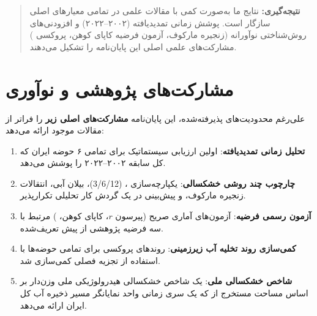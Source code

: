 \documentclass[12pt, a4paper]{article}
\begin{document}
\begin{quote}
  \textbf{نتیجه‌گیری:} نتایج ما به‌صورت کمی با مقالات علمی در تمامی معیارهای اصلی
  سازگار است. پوشش زمانی تمدیدیافته (۲۰۰۲–۲۰۲۲) و افزودنی‌های روش‌شناختی نوآورانه
  (زنجیره مارکوف، آزمون فرضیه کاپای کوهن، پروکسی ) مشارکت‌های علمی اصلی این
  پایان‌نامه را تشکیل می‌دهند.
\end{quote}

\section{مشارکت‌های پژوهشی و نوآوری}
\label{sec:4-9}

علی‌رغم محدودیت‌های پذیرفته‌شده، این پایان‌نامه \textbf{مشارکت‌های اصلی زیر} را فراتر
از مقالات موجود ارائه می‌دهد:

\begin{enumerate}
  \item \textbf{تحلیل زمانی تمدیدیافته}: اولین ارزیابی سیستماتیک  برای
        تمامی ۶ حوضه ایران که کل سابقه  ۲۰۰۲–۲۰۲۲ را پوشش می‌دهد.

  \item \textbf{چارچوب چند روشی خشکسالی}: یکپارچه‌سازی ، 
        (3/6/12)، بیلان آبی، انتقالات زنجیره مارکوف، و پیش‌بینی  در یک گردش
        کار تحلیلی تکرارپذیر.

  \item \textbf{آزمون رسمی فرضیه}: آزمون‌های آماری صریح (پیرسون $r$، کاپای کوهن،
        ) مرتبط با سه فرضیه پژوهشی از پیش تعریف‌شده.

  \item \textbf{کمی‌سازی روند تخلیه آب زیرزمینی}: روندهای پروکسی  برای تمامی
        حوضه‌ها با استفاده از تجزیه فصلی کمی‌سازی شد.

  \item \textbf{شاخص خشکسالی ملی}: یک شاخص خشکسالی هیدرولوژیکی ملی وزن‌دار بر اساس
        مساحت مستخرج از  که یک سری زمانی واحد نمایانگر مسیر ذخیره آب کل
        ایران ارائه می‌دهد.
\end{enumerate}

\end{document}
